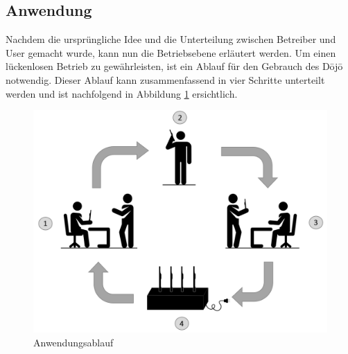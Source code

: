\subsection{Anwendung}\label{sec:ladeablauf}
Nachdem die ursprüngliche Idee und die Unterteilung zwischen Betreiber und User gemacht wurde, kann nun die Betriebsebene erläutert werden.
Um einen lückenlosen Betrieb zu gewährleisten, ist ein Ablauf für den Gebrauch des Dōjō notwendig. Dieser Ablauf kann zusammenfassend in vier Schritte unterteilt werden und ist nachfolgend in Abbildung \ref{fig:Anwendungsablauf Dojo} ersichtlich.

\begin{figure}[H]
	\begin{center}
		\includegraphics[width=140mm]{data/Ladezyklus.png}
		\caption[Anwendungsablauf des Dojos]{Anwendungsablauf} %
		\label{fig:Anwendungsablauf Dojo}
	\end{center}
\end{figure}

